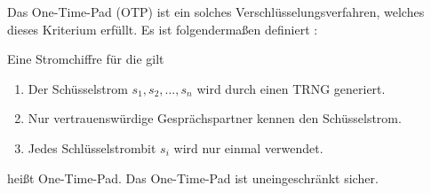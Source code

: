 \noindent
Das One-Time-Pad (OTP) ist ein solches Verschlüsselungsverfahren, welches dieses Kriterium
erfüllt. Es ist folgendermaßen definiert \parencite[37]{BOOK:crypto}:

\begin{definition}
  Eine Stromchiffre für die gilt
  \begin{enumerate}[itemsep=0pt]
    \item Der Schüsselstrom $s_1,s_2,\dots,s_n$ wird durch einen TRNG generiert.
    \item Nur vertrauenswürdige Gesprächspartner kennen den Schüsselstrom.
    \item Jedes Schlüsselstrombit $s_i$ wird nur einmal verwendet.
  \end{enumerate}
  heißt One-Time-Pad. Das One-Time-Pad ist uneingeschränkt sicher.
\end{definition}
